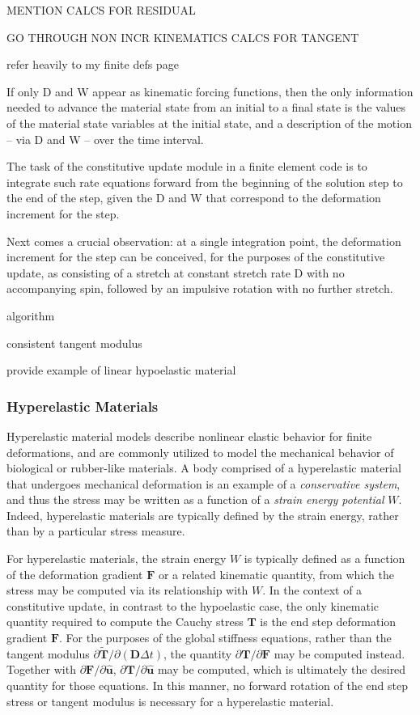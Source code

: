 MENTION CALCS FOR RESIDUAL

GO THROUGH NON INCR KINEMATICS CALCS FOR TANGENT

refer heavily to my finite defs page

If only D and W appear as kinematic forcing functions, then the only information needed to advance the material state from an initial to a final state is the values of the material state variables at the initial state, and a description of the motion – via D and W – over the time interval.

The task of the constitutive update module in a finite element code is to integrate such rate equations forward from the beginning of the solution step to the end of the step, given the D and W that correspond to the deformation increment for the step.

Next comes a crucial observation: at a single integration point, the deformation increment for the step can be conceived, for the purposes of the constitutive update, as consisting of a stretch at constant stretch rate D with no accompanying spin, followed by an impulsive rotation with no further stretch.

algorithm

consistent tangent modulus

provide example of linear hypoelastic material

\subsubsection{Hyperelastic Materials}

Hyperelastic material models describe nonlinear elastic behavior for finite deformations, and are commonly utilized to model the mechanical behavior of biological or rubber-like materials. A body comprised of a hyperelastic material that undergoes mechanical deformation is an example of a  \textit{conservative system}, and thus the stress may be written as a function of a \textit{strain energy potential} $W$. Indeed, hyperelastic materials are typically defined by the strain energy, rather than by a particular stress measure.

For hyperelastic materials, the strain energy $W$ is typically defined as a function of the deformation gradient $\bm{F}$ or a related kinematic quantity, from which the stress may be computed via its relationship with $W$. In the context of a constitutive update, in contrast to the hypoelastic case, the only kinematic quantity required to compute the Cauchy stress $\bm{T}$ is the end step deformation gradient $\bm{F}$. For the purposes of the global stiffness equations, rather than the tangent modulus ${\partial \tilde{\bm{T}}}/{\partial (\bm{D}\Delta{t})}$, the quantity ${\partial \bm{T}}/{\partial \bm{F}}$ may be computed instead. Together with $\partial \bm{F}/\partial \hat{\bm{u}}$, $\partial \bm{T}/\partial \hat{\bm{u}}$ may be computed, which is ultimately the desired quantity for those equations. In this manner, no forward rotation of the end step stress or tangent modulus is necessary for a hyperelastic material.

